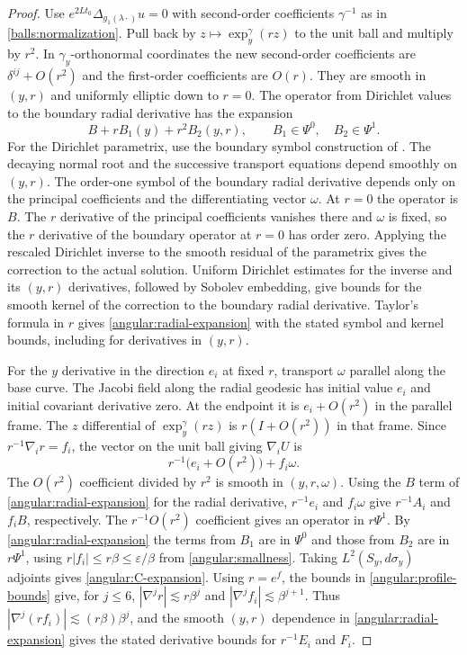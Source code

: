 \documentclass[11pt,a4paper]{article}
\theoremstyle{definition}
\theoremstyle{remark}
\newcommand{\eps}{\varepsilon}
\numberwithin{equation}{section}
\begin{document}
\begin{proof}
Use $e^{2Lt_0}\Delta_{g_1(\lambda\cdot)}u=0$ with second-order
coefficients $\gamma^{-1}$ as in \eqref{balls:normalization}.
Pull back by $z\mapsto\exp_y^\gamma(rz)$ to the unit ball and multiply
by $r^2$. In $\gamma_y$-orthonormal coordinates the new second-order
coefficients are $\delta^{ij}+O(r^2)$ and the first-order coefficients
are $O(r)$. They are smooth in $(y,r)$ and uniformly elliptic down
to $r=0$. The operator from Dirichlet values to the boundary radial
derivative has the expansion
\begin{equation}\label{angular:radial-expansion}
 B+r B_1(y)+r^2 B_2(y,r),\qquad
 B_1\in\Psi^0,\quad B_2\in\Psi^1.
\end{equation}
For the Dirichlet parametrix, use the boundary symbol construction
of \citep[Theorem~1.1(i) and Proposition~3.1]{JoshiLionheart2005}.
The decaying normal root and the successive transport equations
depend smoothly on $(y,r)$. The order-one symbol of the boundary
radial derivative depends only on the principal coefficients and
the differentiating vector $\omega$. At $r=0$ the operator is $B$.
The $r$ derivative of the principal coefficients vanishes there
and $\omega$ is fixed, so the $r$ derivative of the boundary operator
at $r=0$ has order zero.
Applying the rescaled Dirichlet inverse to the smooth residual of
the parametrix gives the correction to the actual solution.
Uniform Dirichlet estimates for the inverse and its $(y,r)$ derivatives,
followed by Sobolev embedding, give bounds for the smooth kernel of
the correction to the boundary radial derivative. Taylor's formula
in $r$ gives \eqref{angular:radial-expansion} with the stated symbol
and kernel bounds, including for derivatives in $(y,r)$.

For the $y$ derivative in the direction $e_i$ at fixed $r$, transport
$\omega$ parallel along the base curve. The Jacobi field along the
radial geodesic has initial value $e_i$ and initial covariant
derivative zero. At the endpoint
it is $e_i+O(r^2)$ in the parallel frame. The $z$ differential of
$\exp_y^\gamma(rz)$ is $r(I+O(r^2))$ in that frame. Since
$r^{-1}\nabla_i r=f_i$, the vector on the unit ball giving $\nabla_iU$ is
\[
 r^{-1}\bigl(e_i+O(r^2)\bigr)+f_i\omega.
\]
The $O(r^2)$ coefficient divided by $r^2$ is smooth in $(y,r,\omega)$.
Using the $B$ term of \eqref{angular:radial-expansion} for the
radial derivative, $r^{-1}e_i$ and $f_i\omega$ give $r^{-1}A_i$
and $f_iB$, respectively. The $r^{-1}O(r^2)$ coefficient
gives an operator in $r\Psi^1$. By \eqref{angular:radial-expansion}
the terms from $B_1$ are in $\Psi^0$ and those from $B_2$ are in
$r\Psi^1$, using $r|f_i|\le r\beta\le\eps/\beta$ from
\eqref{angular:smallness}. Taking $L^2(S_y,d\sigma_y)$ adjoints
gives \eqref{angular:C-expansion}. Using $r=e^f$, the bounds in
\eqref{angular:profile-bounds} give, for $j\le6$,
$|\nabla^j r|\lesssim r\beta^j$ and
$|\nabla^j f_i|\lesssim\beta^{j+1}$.
Thus $|\nabla^j(r f_i)|\lesssim(r\beta)\beta^j$, and the smooth
$(y,r)$ dependence in \eqref{angular:radial-expansion} gives the
stated derivative bounds for $r^{-1}E_i$ and $F_i$.


\end{proof}
\end{document}
